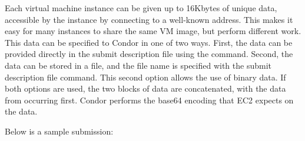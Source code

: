 Each virtual machine instance can be given up to 16Kbytes of unique data, 
accessible by the instance by connecting to a well-known address.
This makes it easy for many instances to share the same VM image,
but perform different work.
This data can be specified to Condor in one of two ways.
First, the data can be provided directly in the submit description file 
using the  command.
Second, the data can be
stored in a file, and the file name is specified with the
 submit description file command.
This second option allows the use of binary data.
If both options are used, the two blocks of
data are concatenated, with the data from  
occurring first.  Condor performs the base64 encoding that EC2 expects on 
the data.

Below is a sample submission: 

